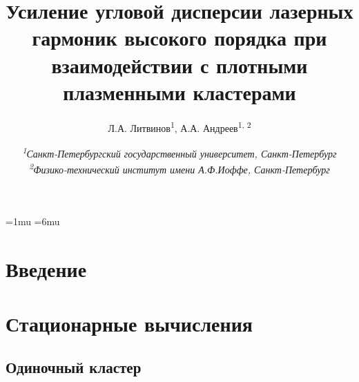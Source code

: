 \documentclass[10pt]{article}
\begin{document}



	\pagestyle{fancy}
	\fancyhf{}
	\fancyhead[L]{\textit{\nouppercase{\leftmark}}}
	\fancyfoot[C]{\thepage}

	\thinmuskip=1mu
	\thickmuskip=6mu
	\def\stacktype{S}\Sstackgap=-4.3pt
	\captionsetup[subfigure]{margin=0.05\textwidth}


	\newcommand{\subfigureautorefname}{\figureautorefname}
	\renewcommand{\thesubfigure}{\asbuk{subfigure}}


	\title{Усиление угловой дисперсии лазерных гармоник высокого порядка при взаимодействии с плотными плазменными кластерами}
	\author{
		Л.А. Литвинов\textsuperscript{1}, А.А. Андреев\textsuperscript{1, 2}
	}
	\date{
		\normalsize{\textit{\textsuperscript{1}Санкт-Петербургский государственный университет, Санкт-Петербург \\ \textsuperscript{2}Физико-технический институт имени А.Ф.Иоффе, Санкт-Петербург}}
	}
	\maketitle

	
	\section{Введение}
	
	\section{Стационарные вычисления}
	\subsection{Одиночный кластер}
	
	
	
	

	\clearpage
	
	
\end{document}
